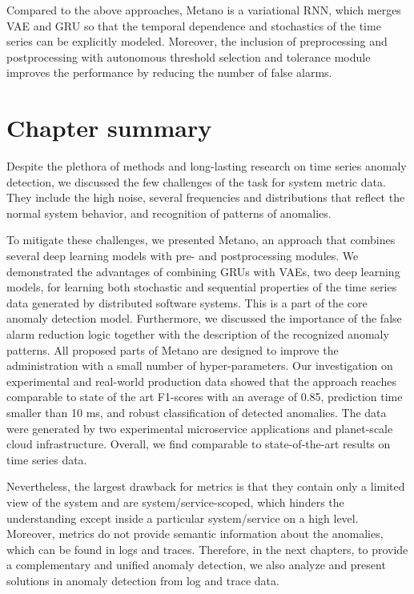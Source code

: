 Compared to the above approaches, Metano is a variational RNN, which merges VAE and GRU so that the temporal dependence and stochastics of the time series can be explicitly modeled. Moreover, the inclusion of preprocessing and postprocessing with autonomous threshold selection and tolerance module improves the performance by reducing the number of false alarms. 

\section{Chapter summary}
Despite the plethora of methods and long-lasting research on time series anomaly detection, we discussed the few challenges of the task for system metric data. They include the high noise, several frequencies and distributions that reflect the normal system behavior, and recognition of patterns of anomalies.

To mitigate these challenges, we presented Metano, an approach that combines several deep learning models with pre- and postprocessing modules. We demonstrated the advantages of combining GRUs with VAEs, two deep learning models, for learning both stochastic and sequential properties of the time series data generated by distributed software systems. This is a part of the core anomaly detection model. Furthermore, we discussed the importance of the false alarm reduction logic together with the description of the recognized anomaly patterns. All proposed parts of Metano are designed to improve the administration with a small number of hyper-parameters. 
Our investigation on experimental and real-world production data showed that the approach reaches comparable to state of the art F1-scores with an average of 0.85, prediction time smaller than 10 ms, and robust classification of detected anomalies. The data were generated by two experimental microservice applications and planet-scale cloud infrastructure. Overall, we find comparable to state-of-the-art results on time series data.

Nevertheless, the largest drawback for metrics is that they contain only a limited view of the system and are system/service-scoped, which hinders the understanding except inside a particular system/service on a high level. Moreover, metrics do not provide semantic information about the anomalies, which can be found in logs and traces.
Therefore, in the next chapters, to provide a complementary and unified anomaly detection, we also analyze and present solutions in anomaly detection from log and trace data.